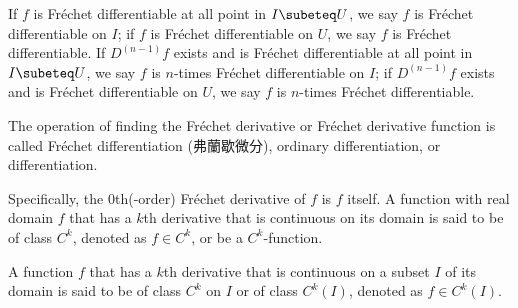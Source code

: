 \documentclass[a4paper,12pt]{report}
\begin{document}
\begin{itemize}
\begin{itemize}
If $f$ is Fréchet differentiable at all point in $I\subeteq U$, we say $f$ is Fréchet differentiable on $I$; if $f$ is Fréchet differentiable on $U$, we say $f$ is Fréchet differentiable. If $D^{(n-1)}f$ exists and is Fréchet differentiable at all point in $I\subeteq U$, we say $f$ is $n$-times Fréchet differentiable on $I$; if $D^{(n-1)}f$ exists and is Fréchet differentiable on $U$, we say $f$ is $n$-times Fréchet differentiable.

The operation of finding the Fréchet derivative or Fréchet derivative function is called Fréchet differentiation (弗蘭歇微分), ordinary differentiation, or differentiation.

Specifically, the $0$th(-order) Fréchet derivative of $f$ is $f$ itself.
A function with real domain $f$ that has a $k$th derivative that is continuous on its domain is said to be of class $C^k$, denoted as $f\in C^k$, or be a $C^k$-function.

A function $f$ that has a $k$th derivative that is continuous on a subset $I$ of its domain is said to be of class $C^k$ on $I$ or of class $C^k(I)$, denoted as $f\in C^k(I)$.


\end{itemize}
\end{itemize}
\end{document}

